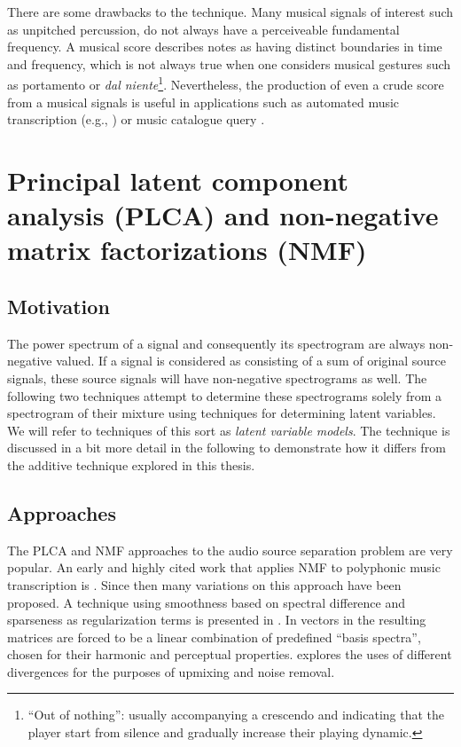 There are some drawbacks to the technique. Many musical signals of interest such
as unpitched percussion, do not always have a perceiveable fundamental
frequency. A musical score describes notes as having distinct boundaries in time
and frequency, which is not always true when one considers
musical gestures such as portamento or \textit{dal niente}\footnote{``Out of
    nothing'': usually accompanying a crescendo and indicating that the player
start from silence and gradually increase their playing dynamic.}. Nevertheless,
the production of even a crude score from a musical signals is useful in
applications such as automated music transcription (e.g.,
\cite{ryynanen2008automatic}) or music catalogue query
\cite{mcnab1996towards}.

\section{Principal latent component analysis (PLCA) and non-negative matrix
factorizations (NMF)}

\subsection{Motivation}

The power spectrum of a signal and consequently its spectrogram are always
non-negative valued. If a signal is considered as consisting of a sum of
original source signals, these source signals will have non-negative
spectrograms as well. The following two techniques attempt to determine these
spectrograms solely from a spectrogram of their mixture using techniques for
determining latent variables. We will refer to techniques of this sort as
\textit{latent variable models}. The technique is discussed in a bit more detail
in the following to demonstrate how it differs from the additive technique
explored in this thesis.

\subsection{Approaches}

The PLCA and NMF approaches to the audio source separation problem are very
popular. An early and highly cited work that applies NMF to polyphonic music
transcription is \cite{smaragdis2003non}. Since then many variations on this
approach have been proposed. A technique using smoothness based on spectral
difference and sparseness as regularization terms is presented in
\cite{virtanen2007monaural}. In \cite{vincent2008harmonic} vectors in the
resulting matrices are forced to be a linear combination of predefined ``basis
spectra'', chosen for their harmonic and perceptual properties.
\cite{bertin2010enforcing} explores the uses of different divergences for the
purposes of upmixing and noise removal.

